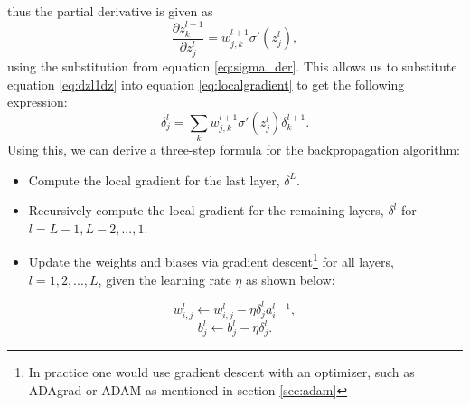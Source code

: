 thus the partial derivative is given as 
\begin{equation}
    \label{eq:dzl1dz}
    \frac{\partial z_k^{l+1}}{\partial z_j^l} = w_{j,k}^{l+1}\sigma'(z_j^l), 
\end{equation}
using the substitution from equation \ref{eq:sigma_der}. This allows us to substitute equation \ref{eq:dzl1dz} into equation \ref{eq:localgradient} to get the following expression:
\begin{equation}
    \label{eq:localgradient2}
    \delta_j^l = \sum_k w_{j,k}^{l+1}\sigma'(z_j^l)\delta_k^{l+1}.
\end{equation}
Using this, we can derive a three-step formula for the backpropagation algorithm:
\begin{itemize}
    \item Compute the local gradient for the last layer, $\delta^L$.
    \item Recursively compute the local gradient for the remaining layers, $\delta^l$ for $l=L-1, L-2, ..., 1$.
    \item Update the weights and biases via gradient descent\footnote{In practice one would use gradient descent with an optimizer, such as ADAgrad or ADAM as mentioned in section \ref{sec:adam}} for all layers, $l=1, 2, ..., L$, given the learning rate $\eta$ as shown below: 
\end{itemize}
\begin{equation*}
    w_{i,j}^{l} \leftarrow w_{i,j}^{l} - \eta \delta_j^l a_i^{l-1},
\end{equation*}
\begin{equation*}
    b_j^l \leftarrow b_j^l - \eta \delta_j^l.
\end{equation*}

